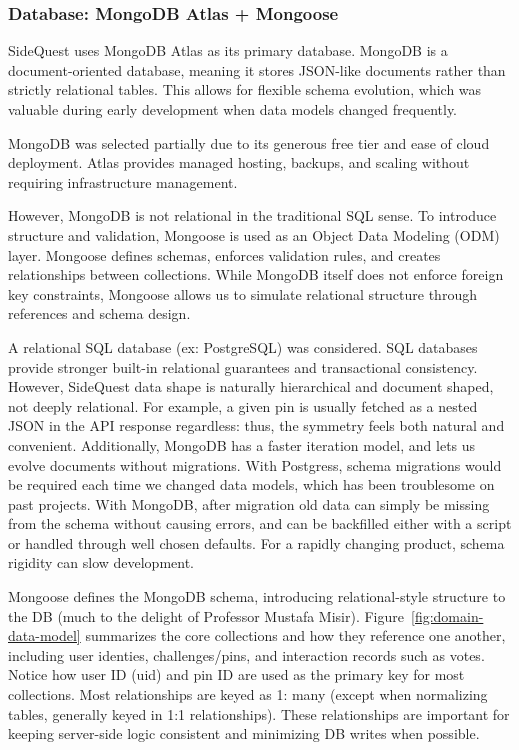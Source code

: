 \documentclass[12pt]{article}
\begin{document}
\subsubsection{Database: MongoDB Atlas + Mongoose}

SideQuest uses MongoDB Atlas as its primary database. MongoDB is a document-oriented database, meaning it stores JSON-like documents rather than strictly relational tables. This allows for flexible schema evolution, which was valuable during early development when data models changed frequently.

MongoDB was selected partially due to its generous free tier and ease of cloud deployment. Atlas provides managed hosting, backups, and scaling without requiring infrastructure management.

However, MongoDB is not relational in the traditional SQL sense. To introduce structure and validation, Mongoose is used as an Object Data Modeling (ODM) layer. Mongoose defines schemas, enforces validation rules, and creates relationships between collections. While MongoDB itself does not enforce foreign key constraints, Mongoose allows us to simulate relational structure through references and schema design.

A relational SQL database (ex: PostgreSQL) was considered. SQL databases provide stronger built-in relational guarantees and transactional consistency. However, SideQuest data shape is naturally hierarchical and document shaped, not deeply relational. For example, a given pin is usually fetched as a nested JSON in the API response regardless: thus, the symmetry feels both natural and convenient. Additionally, MongoDB has a faster iteration model, and lets us evolve documents without migrations. With Postgress, schema migrations would be required each time we changed data models, which has been troublesome on past projects. With MongoDB, after migration old data can simply be missing from the schema without causing errors, and can be backfilled either with a script or handled through well chosen defaults. For a rapidly changing product, schema rigidity can slow development.

Mongoose defines the MongoDB schema, introducing relational-style structure to the DB (much to the delight of Professor Mustafa Misir). Figure~\ref{fig:domain-data-model} summarizes the core collections and how they reference one another, including user identies, challenges/pins, and interaction records such as votes. Notice how user ID (uid) and pin ID are used as the primary key for most collections. Most relationships are keyed as 1: many (except when normalizing tables, generally keyed in 1:1 relationships). These relationships are important for keeping server-side logic consistent and minimizing DB writes when possible.
\end{document}
